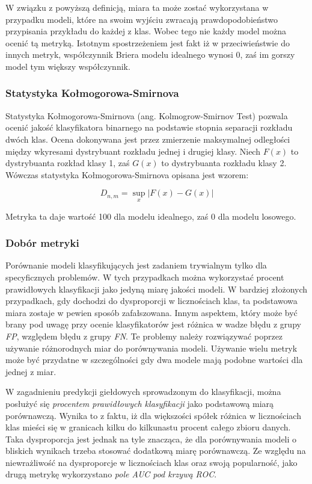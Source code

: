 \documentclass[a4paper, twoside, 11pt, openright]{article}
\begin{document}
W związku z powyższą definicją, miara ta może zostać wykorzystana w przypadku modeli, które na swoim wyjściu zwracają prawdopodobieństwo przypisania przykładu do każdej z klas. Wobec tego nie każdy model można ocenić tą metryką. Istotnym spostrzeżeniem jest fakt iż w przeciwieństwie do innych metryk, współczynnik Briera modelu idealnego wynosi $0$, zaś im gorszy model tym większy współczynnik.


\subsubsection{Statystyka Kołmogorowa-Smirnova}

Statystyka Kołmogorowa-Smirnova (ang. Kolmogrow-Smirnov Test) pozwala ocenić jakość klasyfikatora binarnego na podstawie stopnia separacji rozkładu dwóch klas. Ocena dokonywana jest przez zmierzenie maksymalnej odległości między wkyresami dystrybuant rozkładu jednej i drugiej klasy. Niech $F(x)$ to dystrybuanta rozkład klasy 1, zaś $G(x)$ to dystrybuanta rozkładu klasy 2. Wówczas statystyka Kołmogorowa-Smirnova opisana jest wzorem:

$$D_{n,m}=\sup_x|F(x)-G(x)|$$

Metryka ta daje wartość 100 dla modelu idealnego, zaś 0 dla modelu losowego.

\subsubsection{Dobór metryki}

Porównanie modeli klasyfikujących jest zadaniem trywialnym tylko dla specyficznych problemów. W tych przypadkach można wykorzystać procent prawidłowych klasyfikacji jako jedyną miarę jakości modeli. W bardziej złożonych przypadkach, gdy dochodzi do dysproporcji w licznościach klas, ta podstawowa miara zostaje w pewien sposób zafałszowana. Innym aspektem, który może być brany pod uwagę przy ocenie klasyfikatorów jest różnica w wadze błędu z grupy \textit{FP}, względem błędu z grupy \textit{FN}. Te problemy należy rozwiązywać poprzez używanie różnorodnych miar do porównywania modeli. Używanie wielu metryk może być przydatne w szczególności gdy dwa modele mają podobne wartości dla jednej z miar.

\bigskip

W zagadnieniu predykcji giełdowych sprowadzonym do klasyfikacji, można posłużyć się \textit{procentem prawidłowych klasyfikacji} jako podstawową miarą porównawczą. Wynika to z faktu, iż dla większości spółek różnica w licznościach klas mieści się w granicach kilku do kilkunastu procent całego zbioru danych. Taka dysproporcja jest jednak na tyle znacząca, że dla porównywania modeli o bliskich wynikach trzeba stosować dodatkową miarę porównawczą. Ze względu na niewrażliwość na dysproporcje w licznościach klas oraz swoją popularność, jako drugą metrykę wykorzystano \textit{pole AUC pod krzywą ROC}.
\end{document}
